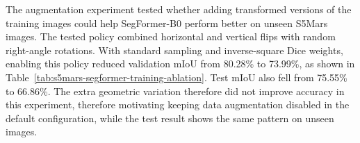 The augmentation experiment tested whether adding transformed versions of the training images could help SegFormer-B0 perform better on unseen S5Mars images. The tested policy combined horizontal and vertical flips with random right-angle rotations. With standard sampling and inverse-square Dice weights, enabling this policy reduced validation mIoU from 80.28\% to 73.99\%, as shown in Table~\ref{tab:s5mars-segformer-training-ablation}. Test mIoU also fell from 75.55\% to 66.86\%. The extra geometric variation therefore did not improve accuracy in this experiment, therefore motivating keeping data augmentation disabled in the default configuration, while the test result shows the same pattern on unseen images.

